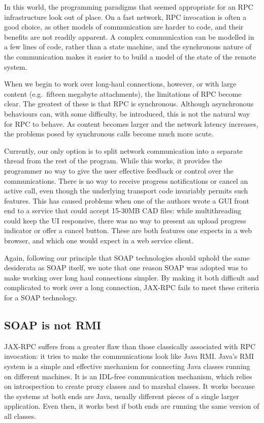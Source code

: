 In this world, the programming paradigms that seemed appropriate for
an RPC infrastructure look out of place. On a fast network, RPC
invocation is often a good choice, as other models of communication
are harder to code, and their benefits are not readily apparent. A complex
communication can be modelled in a few lines of code, rather than a state
machine, and the synchronous nature of the communication makes it easier to
to build a model of the state of the remote system.  

When we begin to work over long-haul connections, however, or with
large content (e.g.\ fifteen megabyte attachments), the limitations of
RPC become clear. The greatest of these is that RPC is
synchronous. Although asynchronous behaviours can, with some
difficulty, be introduced, this is not the natural way for RPC to
behave. As content becomes larger and the network latency increases,
the problems posed by synchronous calls become much more acute.

Currently, our only option is to split network communication into a
separate thread from the rest of the program. While this works, it
provides the programmer no way to give the user effective feedback or
control over the communications. There is no way to receive progress
notifications or cancel an active call, even though the underlying
transport code invariably permits such features. This has caused
problems when one of the authors wrote a GUI front end to a service
that could accept 15-30MB CAD files: while multithreading could keep
the UI responsive, there was no way to present an upload progress
indicator or offer a cancel button. These are both features one
expects in a web browser, and which one would expect in a web service
client.

Again, following our principle that SOAP technologies should uphold
the same desiderata as SOAP itself, we note that one reason SOAP was
adopted was to make working over long haul connections simpler. By
making it both difficult and complicated to work over a long
connection, JAX-RPC fails to meet these criteria for a SOAP
technology.

\subsection{SOAP is not RMI}
\label{objections:soap-not-rmi}

JAX-RPC suffers from a greater flaw than those classically associated
with RPC invocation: it tries to make the communications look like
Java RMI. Java's RMI system is a simple and effective mechanism for
connecting Java classes running on different machines. It is an
IDL-free communication mechanism, which relies on introspection to
create proxy classes and to marshal classes. It works because the
systems at both ends are Java, usually different pieces of a single
larger application. Even then, it works best if both ends are running
the same version of all classes.


